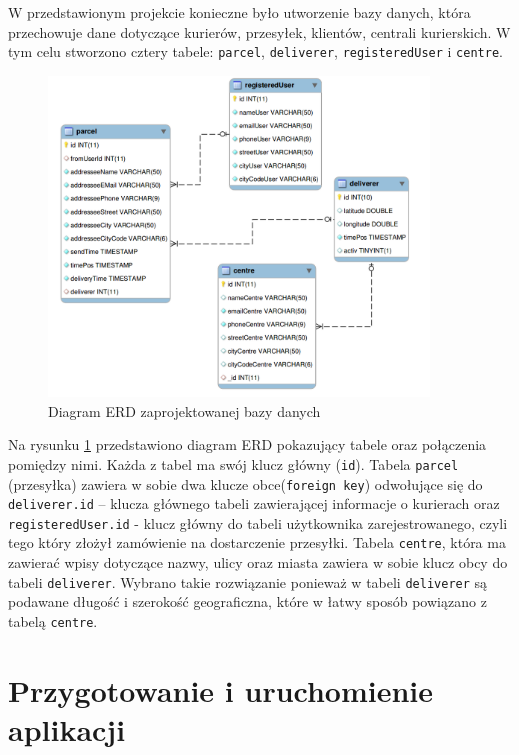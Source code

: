\documentclass[eng,printmode,oneside]{mgr}
\begin{document}
W przedstawionym projekcie konieczne było utworzenie bazy danych, która
przechowuje dane dotyczące kurierów, przesyłek, klientów, centrali kurierskich.
W tym celu stworzono cztery tabele: \texttt{parcel}, \texttt{deliverer},
\texttt{registeredUser} i \texttt{centre}.

\begin{figure}[ht!]
\centering
\includegraphics[width=0.9\textwidth]{ERD.png}
\caption{Diagram ERD zaprojektowanej bazy danych}
\label{fig:ERD}
\end{figure}

Na rysunku \ref{fig:ERD} przedstawiono diagram ERD pokazujący tabele oraz
połączenia pomiędzy nimi. Każda z tabel ma swój klucz główny (\texttt{id}).
Tabela \texttt{parcel} (przesyłka) zawiera w sobie dwa klucze obce(\texttt{foreign
key}) odwołujące się do \texttt{deliverer.id} -- klucza głównego
tabeli zawierającej informacje o kurierach oraz \texttt{registeredUser.id} -
klucz główny do tabeli użytkownika zarejestrowanego, czyli tego który złożył
zamówienie na dostarczenie przesyłki. Tabela \texttt{centre}, która ma zawierać
wpisy dotyczące nazwy, ulicy oraz miasta zawiera w sobie klucz obcy do tabeli
\texttt{deliverer}. Wybrano takie rozwiązanie ponieważ w tabeli
\texttt{deliverer} są podawane długość i szerokość geograficzna, które w łatwy sposób powiązano z tabelą \texttt{centre}.

\chapter{Przygotowanie i uruchomienie aplikacji}
\end{document}
